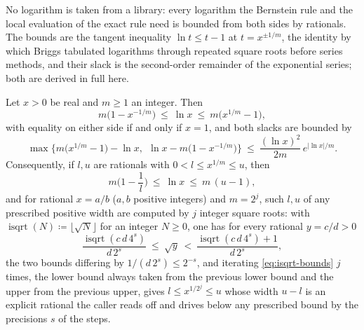 
No logarithm is taken from a library: every logarithm the Bernstein rule and
the local evaluation of the exact rule need is bounded from both sides by
rationals. The bounds are the tangent inequality $\ln t\le t-1$ at
$t=x^{\pm1/m}$, the identity by which Briggs tabulated logarithms through
repeated square roots before series methods, and their slack is the
second-order remainder of the exponential series; both are derived in full
here.

\begin{lemma}\label{lem:log-enclosure}
Let $x>0$ be real and $m\ge1$ an integer. Then
\begin{equation}\label{eq:log-root-bounds}
  m\big(1-x^{-1/m}\big)\ \le\ \ln x\ \le\ m\big(x^{1/m}-1\big),
\end{equation}
with equality on either side if and only if $x=1$, and both slacks are bounded
by
\begin{equation}\label{eq:log-root-slack}
  \max\Big\{m\big(x^{1/m}-1\big)-\ln x,\ \ \ln x-m\big(1-x^{-1/m}\big)\Big\}
  \ \le\ \frac{(\ln x)^{2}}{2m}\,e^{|\ln x|/m}.
\end{equation}
Consequently, if $l,u$ are rationals with $0<l\le x^{1/m}\le u$, then
\begin{equation}\label{eq:log-rational-bounds}
  m\Big(1-\frac1l\Big)\ \le\ \ln x\ \le\ m\,(u-1),
\end{equation}
and for rational $x=a/b$ ($a,b$ positive integers) and $m=2^{j}$, such
$l,u$ of any prescribed positive width are computed by $j$ integer square
roots: with $\operatorname{isqrt}(N)\coloneqq\lfloor\sqrt N\rfloor$
for an integer $N\ge0$, one has for every rational $y=c/d>0$
\begin{equation}\label{eq:isqrt-bounds}
  \frac{\operatorname{isqrt}(c\,d\,4^{s})}{d\,2^{s}}
  \ \le\ \sqrt{y}\ <\
  \frac{\operatorname{isqrt}(c\,d\,4^{s})+1}{d\,2^{s}},
\end{equation}
the two bounds differing by $1/(d\,2^{s})\le2^{-s}$, and iterating
\eqref{eq:isqrt-bounds} $j$ times, the lower bound always taken from the
previous lower bound and the upper from the previous upper, gives
$l\le x^{1/2^{j}}\le u$ whose width $u-l$ is an explicit rational the
caller reads off and drives below any prescribed bound by the precisions
$s$ of the steps.
\end{lemma}


